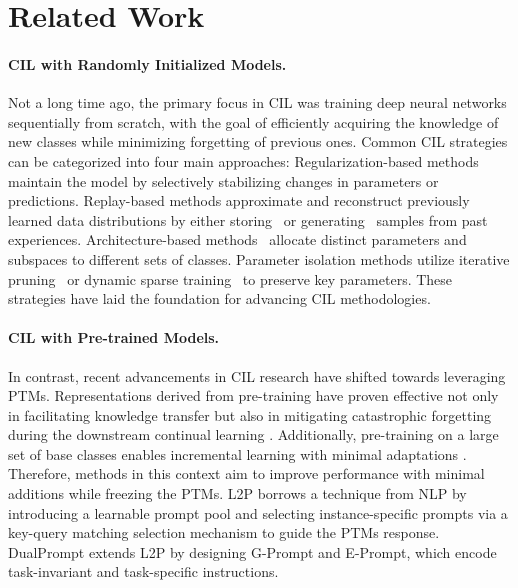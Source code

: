 \section{Related Work}

\paragraph{CIL with Randomly Initialized Models.}
Not a long time ago, the primary focus in CIL was training deep neural networks sequentially from scratch, with the goal of efficiently acquiring the knowledge of new classes while minimizing forgetting of previous ones. Common CIL strategies can be categorized into four main approaches: Regularization-based methods \cite{ewc, lwf, mas, si} maintain the model by selectively stabilizing changes in parameters or predictions.
Replay-based methods approximate and reconstruct previously learned data distributions by either storing~\cite{icarl, gdumb, gem, bic, wa, rainbow, rmm, cls-er, esmer} or generating~\cite{decebal2016gen, shin2017continual, he2018exemplar, hu2019overcoming, fetril} samples from past experiences.
Architecture-based methods~\cite{expertgate, der, foster, par, memo} allocate distinct parameters and subspaces to different sets of classes. 
Parameter isolation methods utilize iterative pruning~\cite{packnet, clnp, supsup, cps} or dynamic sparse training~\cite{nispa, wsn, sparcl, softsubnet} to preserve key parameters.
These strategies have laid the foundation for advancing CIL methodologies.
\paragraph{CIL with Pre-trained Models.}
In contrast, recent advancements in CIL research have shifted towards leveraging PTMs. Representations derived from pre-training have proven effective not only in facilitating knowledge transfer but also in mitigating catastrophic forgetting during the downstream continual learning \cite{ptm_effect1, ptm_effect2}. Additionally, pre-training on a large set of base classes enables incremental learning with minimal adaptations \cite{ptm_effect3}. Therefore, methods in this context aim to improve performance with minimal additions while freezing the PTMs.
L2P \cite{l2p} borrows a technique from NLP by introducing a learnable prompt pool and selecting instance-specific prompts via a key-query matching selection mechanism to guide the PTMs response. 
DualPrompt \cite{dualprompt} extends L2P by designing G-Prompt and E-Prompt, which encode task-invariant and task-specific instructions. 


